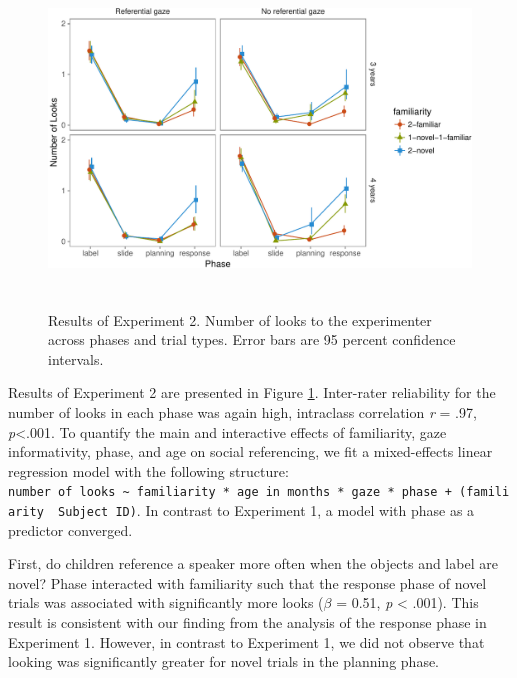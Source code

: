\documentclass[10pt, letterpaper]{article}
\newenvironment{CodeChunk}{}{}
\begin{document}
\begin{CodeChunk}
\begin{figure}[h]

{\centering \includegraphics[width=5.75in,height=3.5in]{figs/results_e2-1} 

}

\caption[Results of Experiment 2]{Results of Experiment 2. Number of looks to the experimenter across phases and trial types. Error bars are 95 percent confidence intervals.}\label{fig:results_e2}
\end{figure}
\end{CodeChunk}

Results of Experiment 2 are presented in Figure \ref{fig:results_e2}.
Inter-rater reliability for the number of looks in each phase was again
high, intraclass correlation \emph{r} = .97, \emph{p}\textless{}.001. To
quantify the main and interactive effects of familiarity, gaze
informativity, phase, and age on social referencing, we fit a
mixed-effects linear regression model with the following structure:
\texttt{number\ of\ looks\ \textasciitilde{}\ familiarity\ *\ age\ in\ months\ *\ gaze\ *\ phase\ +\ (familiarity\ \textbar{}\ Subject\ ID)}.
In contrast to Experiment 1, a model with phase as a predictor
converged.

First, do children reference a speaker more often when the objects and
label are novel? Phase interacted with familiarity such that the
response phase of novel trials was associated with significantly more
looks (\textbf{\(\beta\)} = 0.51, \emph{p} \textless{} .001). This
result is consistent with our finding from the analysis of the response
phase in Experiment 1. However, in contrast to Experiment 1, we did not
observe that looking was significantly greater for novel trials in the
planning phase.
\end{document}
